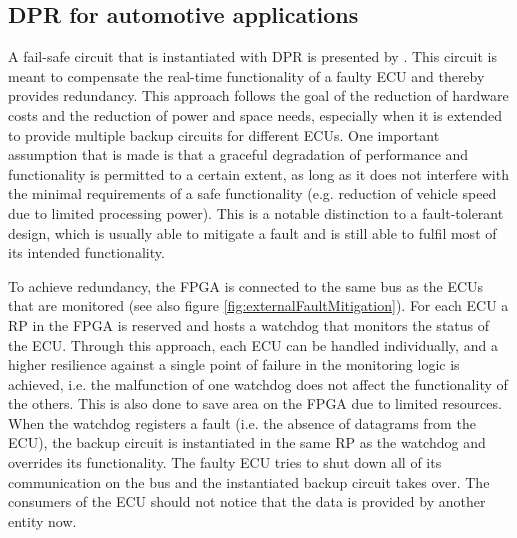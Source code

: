 \subsection{\gls{DPR} for automotive applications}
A fail-safe circuit that is instantiated with \gls{DPR} is presented by \cite{crdl_fail-safe_nodate}. 
This circuit is meant to compensate the real-time functionality of a faulty \gls{ECU} and thereby provides redundancy.
This approach follows the goal of the reduction of hardware costs and the reduction of power and space needs, especially when it is extended to provide multiple backup circuits for different \glspl{ECU}.
One important assumption that is made is that a graceful degradation of performance and functionality is permitted to a certain extent, as long as it does not interfere with the minimal requirements of a safe functionality (e.g. reduction of vehicle speed due to limited processing power).
This is a notable distinction to a fault-tolerant design, which is usually able to mitigate a fault and is still able to fulfil most of its intended functionality.

To achieve redundancy, the \gls{FPGA} is connected to the same bus as the \glspl{ECU} that are monitored (see also figure \ref{fig:externalFaultMitigation}).
For each \gls{ECU} a \gls{RP} in the \gls{FPGA} is reserved and hosts a watchdog that monitors the status of the \gls{ECU}.
Through this approach, each \gls{ECU} can be handled individually, and a higher resilience against a single point of failure in the monitoring logic is achieved, i.e. the malfunction of one watchdog does not affect the functionality of the others.
This is also done to save area on the \gls{FPGA} due to limited resources.
When the watchdog registers a fault (i.e. the absence of datagrams from the \gls{ECU}), the backup circuit is instantiated in the same \gls{RP} as the watchdog and overrides its functionality.
The faulty \gls{ECU} tries to shut down all of its communication on the bus and the instantiated backup circuit takes over.
The consumers of the \gls{ECU} should not notice that the data is provided by another entity now.

